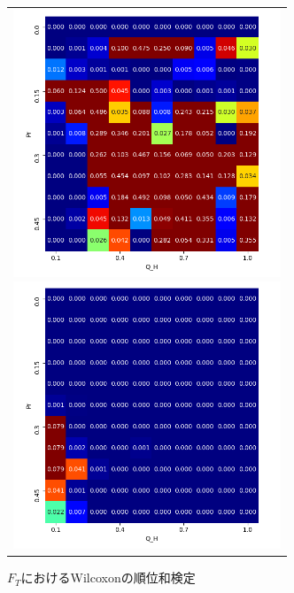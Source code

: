 \documentclass[a4paper,fontsize=11pt,report,notitlepage,line_length=38zw,number_of_lines=40,dvipdfmx]{jlreq}
\begin{document}
\begin{figure}[hbtp]
  \begin{center}
    \begin{tabular}{c}
      \begin{minipage}{0.5\hsize}
        \begin{center}
          \includegraphics[width=8cm]{wilcoxon_seller.png}
          \caption{$F_H$におけるWilcoxonの順位和検定}
          \label{wilcoxon_seller}
        \end{center}
      \end{minipage}

      \begin{minipage}{0.5\hsize}
        \begin{center}
          \includegraphics[width=8cm]{wilcoxon_buyer.png}
          \caption{$F_T$におけるWilcoxonの順位和検定}
           \label{wilcoxon_buyer}
        \end{center}
      \end{minipage}
    \end{tabular}
  \end{center}
\end{figure}
\end{document}
